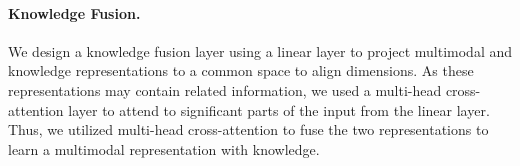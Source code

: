 

\paragraph{Knowledge Fusion.}
\label{knowledge-fusion-layer}
We design a knowledge fusion layer
using a linear layer to project multimodal and knowledge representations to a common space to align dimensions. 
As these representations may contain related information, we used a multi-head cross-attention layer to attend to significant parts of the input from the linear layer. Thus, we utilized multi-head cross-attention to fuse the two representations to learn a multimodal representation with knowledge. 

